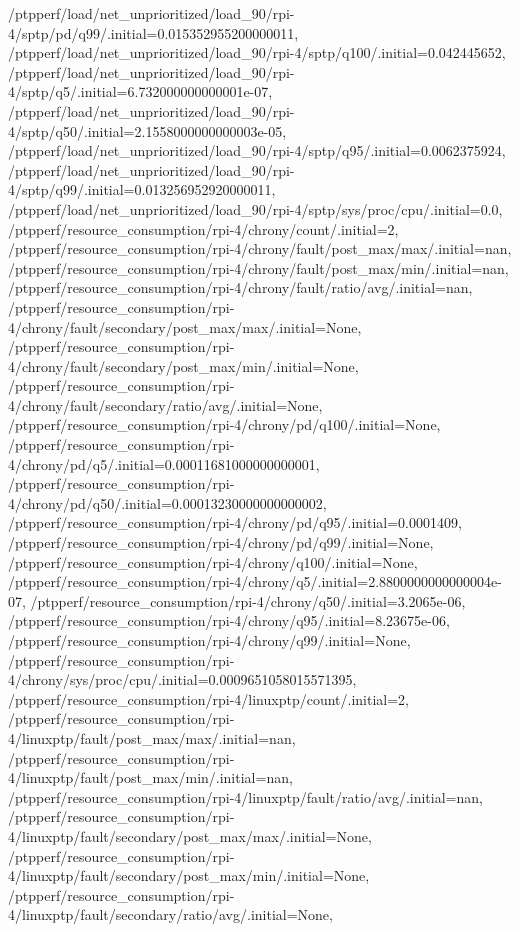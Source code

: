 {    /ptpperf/load/net_unprioritized/load_90/rpi-4/sptp/pd/q99/.initial=0.015352955200000011,
    /ptpperf/load/net_unprioritized/load_90/rpi-4/sptp/q100/.initial=0.042445652,
    /ptpperf/load/net_unprioritized/load_90/rpi-4/sptp/q5/.initial=6.732000000000001e-07,
    /ptpperf/load/net_unprioritized/load_90/rpi-4/sptp/q50/.initial=2.1558000000000003e-05,
    /ptpperf/load/net_unprioritized/load_90/rpi-4/sptp/q95/.initial=0.0062375924,
    /ptpperf/load/net_unprioritized/load_90/rpi-4/sptp/q99/.initial=0.013256952920000011,
    /ptpperf/load/net_unprioritized/load_90/rpi-4/sptp/sys/proc/cpu/.initial=0.0,
    /ptpperf/resource_consumption/rpi-4/chrony/count/.initial=2,
    /ptpperf/resource_consumption/rpi-4/chrony/fault/post_max/max/.initial=nan,
    /ptpperf/resource_consumption/rpi-4/chrony/fault/post_max/min/.initial=nan,
    /ptpperf/resource_consumption/rpi-4/chrony/fault/ratio/avg/.initial=nan,
    /ptpperf/resource_consumption/rpi-4/chrony/fault/secondary/post_max/max/.initial=None,
    /ptpperf/resource_consumption/rpi-4/chrony/fault/secondary/post_max/min/.initial=None,
    /ptpperf/resource_consumption/rpi-4/chrony/fault/secondary/ratio/avg/.initial=None,
    /ptpperf/resource_consumption/rpi-4/chrony/pd/q100/.initial=None,
    /ptpperf/resource_consumption/rpi-4/chrony/pd/q5/.initial=0.00011681000000000001,
    /ptpperf/resource_consumption/rpi-4/chrony/pd/q50/.initial=0.00013230000000000002,
    /ptpperf/resource_consumption/rpi-4/chrony/pd/q95/.initial=0.0001409,
    /ptpperf/resource_consumption/rpi-4/chrony/pd/q99/.initial=None,
    /ptpperf/resource_consumption/rpi-4/chrony/q100/.initial=None,
    /ptpperf/resource_consumption/rpi-4/chrony/q5/.initial=2.8800000000000004e-07,
    /ptpperf/resource_consumption/rpi-4/chrony/q50/.initial=3.2065e-06,
    /ptpperf/resource_consumption/rpi-4/chrony/q95/.initial=8.23675e-06,
    /ptpperf/resource_consumption/rpi-4/chrony/q99/.initial=None,
    /ptpperf/resource_consumption/rpi-4/chrony/sys/proc/cpu/.initial=0.0009651058015571395,
    /ptpperf/resource_consumption/rpi-4/linuxptp/count/.initial=2,
    /ptpperf/resource_consumption/rpi-4/linuxptp/fault/post_max/max/.initial=nan,
    /ptpperf/resource_consumption/rpi-4/linuxptp/fault/post_max/min/.initial=nan,
    /ptpperf/resource_consumption/rpi-4/linuxptp/fault/ratio/avg/.initial=nan,
    /ptpperf/resource_consumption/rpi-4/linuxptp/fault/secondary/post_max/max/.initial=None,
    /ptpperf/resource_consumption/rpi-4/linuxptp/fault/secondary/post_max/min/.initial=None,
    /ptpperf/resource_consumption/rpi-4/linuxptp/fault/secondary/ratio/avg/.initial=None,
}
